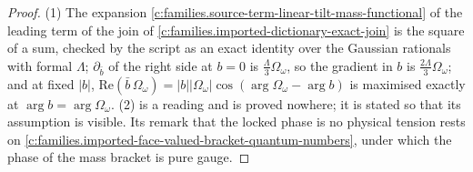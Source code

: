 \documentclass[11pt]{article}
\theoremstyle{definition}
\theoremstyle{plain}
\begin{document}
\begin{proof}
(1) The expansion \ref{c:families.source-term-linear-tilt-mass-functional} of the leading term of the join of \ref{c:families.imported-dictionary-exact-join} is the square of a sum, checked by the script as an exact identity over the Gaussian rationals with formal $\Lambda$; $\partial_{\bar b}$ of the right side at $b = 0$ is $\tfrac{\Lambda}{3}\Omega_{\omega}$, so the gradient in $b$ is $\tfrac{2\Lambda}{3}\Omega_{\omega}$; and at fixed $|b|$, $\mathrm{Re}(\bar b\,\Omega_{\omega}) = |b||\Omega_{\omega}|\cos(\arg\Omega_{\omega} - \arg b)$ is maximised exactly at $\arg b = \arg\Omega_{\omega}$. (2) is a reading and is proved nowhere; it is stated so that its assumption is visible. Its remark that the locked phase is no physical tension rests on \ref{c:families.imported-face-valued-bracket-quantum-numbers}, under which the phase of the mass bracket is pure gauge.

\end{proof}
\end{document}
